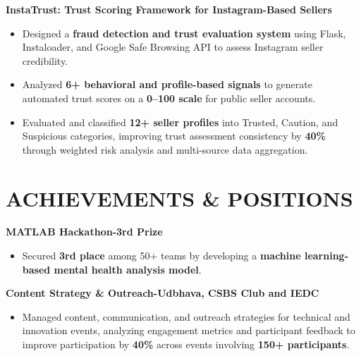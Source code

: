 \documentclass[10pt,a4paper]{article}
\begin{document}
\textbf{InstaTrust: Trust Scoring Framework for Instagram-Based Sellers}  
\begin{itemize}[noitemsep, topsep=0pt, leftmargin=*]
    \item Designed a \textbf{fraud detection and trust evaluation system} using Flask, Instaloader, and Google Safe Browsing API to assess Instagram seller credibility.
    
    \item Analyzed \textbf{6+ behavioral and profile-based signals} to generate automated trust scores on a \textbf{0--100 scale} for public seller accounts.
    
    \item Evaluated and classified \textbf{12+ seller profiles} into Trusted, Caution, and Suspicious categories, improving trust assessment consistency by \textbf{40\%} through weighted risk analysis and multi-source data aggregation.
\end{itemize}
\section*{ACHIEVEMENTS \& POSITIONS}

\textbf{MATLAB Hackathon-3rd Prize}  
\begin{itemize}[noitemsep, topsep=0pt, leftmargin=*]
    \item Secured \textbf{3rd place} among 50+ teams by developing a \textbf{machine learning-based mental health analysis model}.
\end{itemize}

\vspace{0.2em}

\textbf{Content Strategy \& Outreach-Udbhava, CSBS Club and IEDC}  
\begin{itemize}[noitemsep, topsep=0pt, leftmargin=*]
    \item Managed content, communication, and outreach strategies for technical and innovation events, analyzing engagement metrics and participant feedback to improve participation by \textbf{40\%} across events involving \textbf{150+ participants}.
\end{itemize}

\vspace{0.2em}
\end{document}
